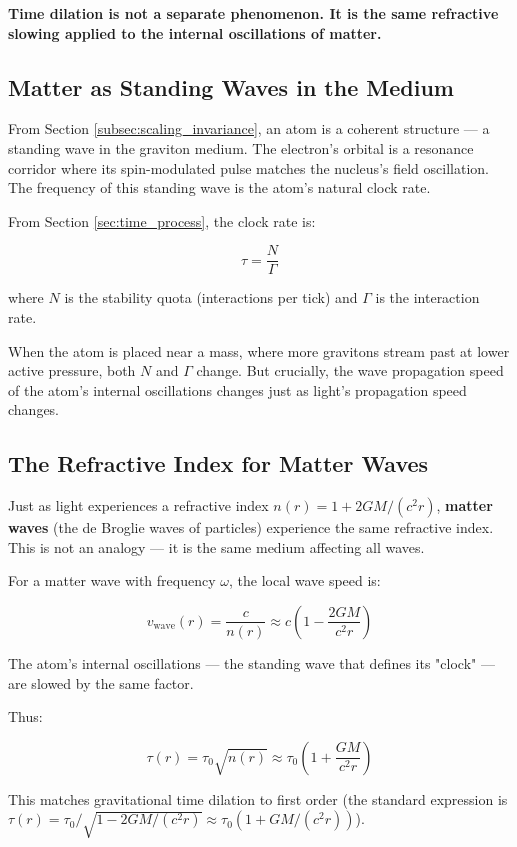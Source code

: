 \documentclass[12pt, a4paper]{article}
\begin{document}
\textbf{Time dilation is not a separate phenomenon. It is the same refractive slowing applied to the internal oscillations of matter.}

\subsection{Matter as Standing Waves in the Medium}
\label{subsec:matter_standing_waves}

From Section \ref{subsec:scaling_invariance}, an atom is a coherent structure — a standing wave in the graviton medium. The electron's orbital is a resonance corridor where its spin-modulated pulse matches the nucleus's field oscillation. The frequency of this standing wave is the atom's natural clock rate.

From Section \ref{sec:time_process}, the clock rate is:

\[
\tau = \frac{N}{\Gamma}
\]

where \( N \) is the stability quota (interactions per tick) and \( \Gamma \) is the interaction rate.

When the atom is placed near a mass, where more gravitons stream past at lower active pressure, both \( N \) and \( \Gamma \) change. But crucially, the wave propagation speed of the atom's internal oscillations changes just as light's propagation speed changes.

\subsection{The Refractive Index for Matter Waves}
\label{subsec:matter_refractive}

Just as light experiences a refractive index \( n(r) = 1 + 2GM/(c^2 r) \), \textbf{matter waves} (the de Broglie waves of particles) experience the same refractive index. This is not an analogy — it is the same medium affecting all waves.

For a matter wave with frequency \( \omega \), the local wave speed is:

\[
v_{\text{wave}}(r) = \frac{c}{n(r)} \approx c \left(1 - \frac{2GM}{c^2 r}\right)
\]

The atom's internal oscillations — the standing wave that defines its "clock" — are slowed by the same factor.

Thus:

\[
\tau(r) = \tau_0 \sqrt{n(r)} \approx \tau_0 \left(1 + \frac{GM}{c^2 r}\right)
\]

This matches gravitational time dilation to first order (the standard expression is \( \tau(r) = \tau_0 / \sqrt{1 - 2GM/(c^2 r)} \approx \tau_0 (1 + GM/(c^2 r)) \)).
\end{document}
